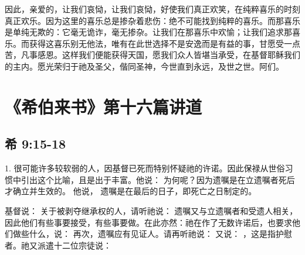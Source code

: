 因此，亲爱的，让我们哀恸，让我们哀恸，好使我们真正欢笑，在纯粹喜乐的时刻真正欢乐。因为这里的喜乐总是掺杂着悲伤：绝不可能找到纯粹的喜乐。而那喜乐是单纯无欺的：它毫无诡诈，毫无掺杂。让我们在那喜乐中欢愉；让我们追求那喜乐。而获得这喜乐别无他法，唯有在此世选择不是安逸而是有益的事，甘愿受一点苦，凡事感恩。这样我们便能获得天国，愿我们众人皆堪当承受，在基督耶稣我们的主内。愿光荣归于祂及圣父，偕同圣神，今世直到永远，及世之世。阿们。\par



\section{《希伯来书》第十六篇讲道}


\subsection{希 9:15-18}

\par

1. 很可能许多较软弱的人，因基督已死而特别怀疑祂的许诺。因此保禄从世俗习惯中引出这个比喻，且是出于丰富。他说： 为何呢？因为遗嘱是在立遗嘱者死后才确立并生效的。 他说， 遗嘱是在最后的日子，即死亡之日制定的。\par

基督说：  关于被剥夺继承权的人，请听祂说：  遗嘱又与立遗嘱者和受遗人相关，因此他们有些事要接受，有些事要做。在此亦然：祂在作了无数许诺后，也要求他们做些什么，说：  再次，遗嘱应有见证人。请再听祂说：  又说： ，这是指护慰者。祂又派遣十二位宗徒说：\par

